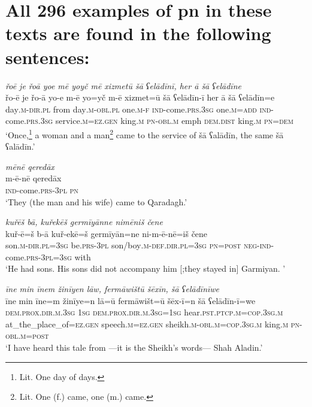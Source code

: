 \chapter{All 296 examples of pn in these texts are found in the following sentences:}

\ea \label{ZB.1}
\textit{řoē je řoā yoe mē yoyč mē xizmetū šā ʕelādīnī, her ā šā ʕelādīne} \\ 
\gll řo-ē je řo-ā yo-e m-ē yo=yč m-ē xizmet=ū šā ʕelādīn-ī her ā šā ʕelādīn=e \\ 
 day\textsc{.m}\textsc{-dir}\textsc{.pl} from day\textsc{.m}\textsc{-obl}\textsc{.pl} one\textsc{.m}\textsc{-f} \textsc{ind-}come\textsc{.prs}\textsc{.3sg} one\textsc{.m}\textsc{=add} \textsc{ind-}come\textsc{.prs}\textsc{.3sg} service\textsc{.m}\textsc{\textsc{=ez.gen}} king\textsc{.m} \textsc{pn}\textsc{-obl}\textsc{.m} emph \textsc{dem.dist} king\textsc{.m} \textsc{pn}\textsc{=dem} \\ 
\glt `Once,\footnote{Lit. One day of days.} a woman and a man\footnote{Lit. One (f.) came, one (m.) came.} came to the service of šā ʕalādīn, the same šā ʕalādīn.'
\z 
 
\ea \label{ZB.4}
\textit{mēnē qeredāx} \\ 
\gll m-ē-nē qeredāx \\ 
 \textsc{ind-}come\textsc{.prs}\textsc{-3pl} \textsc{pn} \\ 
\glt `They (the man and his wife) came to Qaradagh.'
\z 
 
\ea \label{ZB.9}
\textit{kuřēš bā, kuřekēš germīyānne nimēniš čene} \\ 
\gll kuř-ē=š b-ā kuř-ekē=š germīyān=ne ni-m-ē-nē=iš čene \\ 
 son\textsc{.m}\textsc{-dir}\textsc{.pl}\textsc{=3sg} be\textsc{.prs}\textsc{-3pl} son/boy\textsc{.m}\textsc{-def}\textsc{.dir}\textsc{.pl}\textsc{=3sg} \textsc{pn}\textsc{=\textsc{post}} \textsc{neg-}\textsc{ind-}come\textsc{.prs}\textsc{-3pl}\textsc{=3sg} with \\ 
\glt `He had sons. His sons did not accompany him [;they stayed in] Garmiyan. '
\z 
 
\ea \label{ZB.37}
\textit{īne min īnem žinīyen lāw, fermāwištū šēxīn, šā ʕelādīnīwe} \\ 
\gll īne min īne=m žinīye=n lā=ū fermāwišt=ū šēx-ī=n šā ʕelādīn-ī=we \\ 
 \textsc{dem.prox}\textsc{.dir}\textsc{.m}\textsc{.3sg} \textsc{1sg} \textsc{dem.prox}\textsc{.dir}\textsc{.m}\textsc{.3sg}\textsc{=\textsc{1sg}} hear\textsc{.pst}\textsc{.ptcp}\textsc{.m}\textsc{=cop}\textsc{.3sg}\textsc{.m} at\_the\_place\_of\textsc{\textsc{=ez.gen}} speech\textsc{.m}\textsc{\textsc{=ez.gen}} sheikh\textsc{.m}\textsc{-obl}\textsc{.m}\textsc{=cop}\textsc{.3sg}\textsc{.m} king\textsc{.m} \textsc{pn}\textsc{-obl}\textsc{.m}\textsc{=\textsc{post}} \\ 
\glt `I have heard this tale from —it is the Sheikh’s words— Shah Aladin.'
\z 
 
